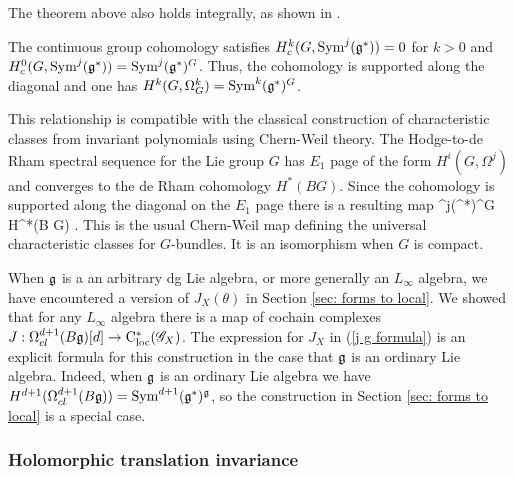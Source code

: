 \begin{rmk}
The theorem above also holds integrally, as shown in \cite{Totaro}.
\end{rmk}

The continuous group cohomology satisfies $H^k_c(G, {\rm Sym}^j(\mathfrak g^*)) = 0$ for $k > 0$ and $H^0_c(G, {\rm Sym}^j(\mathfrak g^*)) = {\rm Sym}^j(\mathfrak g^*)^G$.
Thus, the cohomology is supported along the diagonal and one has $H^{k}(G, \Omega^k_G) = {\rm Sym}^k(\mathfrak g^*)^G$. 

This relationship is compatible with the classical construction of characteristic classes from invariant polynomials using Chern-Weil theory.
The Hodge-to-de Rham spectral sequence for the Lie group $G$ has $E_1$ page of the form $H^i(G, \Omega^j)$ and converges to the de Rham cohomology $H^*(BG)$. 
Since the cohomology is supported along the diagonal on the $E_1$ page there is a resulting map
\ben
\Sym^j(\fg^*)^G \to H^*(B G) .
\een
This is the usual Chern-Weil map defining the universal characteristic classes for $G$-bundles.  
It is an isomorphism when $G$ is compact.

\begin{rmk}
When $\mathfrak g$ is a an arbitrary dg Lie algebra, or more generally an $L_\infty$ algebra, we have encountered a version of $J_X(\theta)$ in Section \ref{sec: forms to local}. 
We showed that for any $L_\infty$ algebra there is a map of cochain complexes $J : \Omega^{d+1}_{cl}(B\mathfrak g) [d] \to {\rm C}_{\rm loc}^*(\mathscr G_X)$.
The expression for $J_X$ in (\ref{j g formula}) is an explicit formula for this construction in the case that $\mathfrak g$ is an ordinary Lie algebra.
Indeed, when $\mathfrak g$ is an ordinary Lie algebra we have $H^{d+1} (\Omega^{d+1}_{cl}(B\mathfrak g)) = {\rm Sym}^{d+1}(\mathfrak g^*)^\mathfrak g$, so the construction in Section \ref{sec: forms to local} is a special case.
\end{rmk}


\subsubsection{Holomorphic translation invariance}

